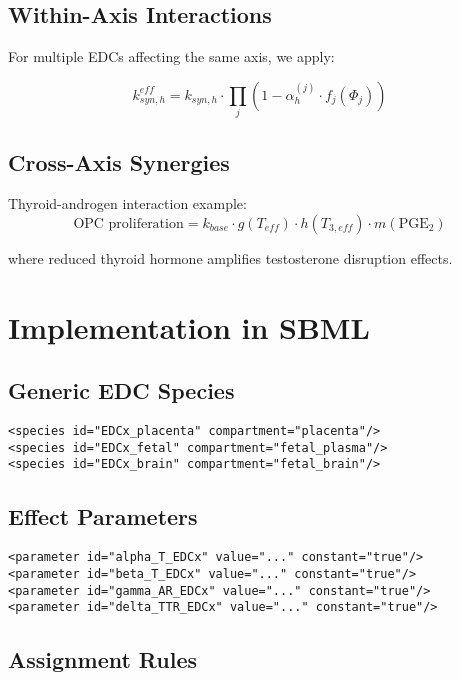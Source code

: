 \documentclass[11pt]{article}
\begin{document}
\subsection{Within-Axis Interactions}

For multiple EDCs affecting the same axis, we apply:

\begin{equation}
k_{syn,h}^{eff} = k_{syn,h} \cdot \prod_j \left(1 - \alpha_h^{(j)} \cdot f_j(\Phi_j)\right)
\end{equation}

\subsection{Cross-Axis Synergies}

Thyroid-androgen interaction example:
\begin{equation}
\text{OPC proliferation} = k_{base} \cdot g(T_{eff}) \cdot h(T_{3,eff}) \cdot m(\text{PGE}_2)
\end{equation}

where reduced thyroid hormone amplifies testosterone disruption effects.

\section{Implementation in SBML}

\subsection{Generic EDC Species}
\begin{verbatim}
<species id="EDCx_placenta" compartment="placenta"/>
<species id="EDCx_fetal" compartment="fetal_plasma"/>
<species id="EDCx_brain" compartment="fetal_brain"/>
\end{verbatim}

\subsection{Effect Parameters}
\begin{verbatim}
<parameter id="alpha_T_EDCx" value="..." constant="true"/>
<parameter id="beta_T_EDCx" value="..." constant="true"/>
<parameter id="gamma_AR_EDCx" value="..." constant="true"/>
<parameter id="delta_TTR_EDCx" value="..." constant="true"/>
\end{verbatim}

\subsection{Assignment Rules}
\end{document}
